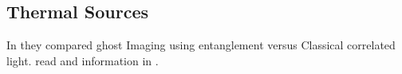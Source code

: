 \subsection{Thermal Sources}
In \cite{thermal} they compared ghost Imaging using entanglement versus Classical correlated light. read and information in \cite{thermalAlejandra}. \cite{intensity}



